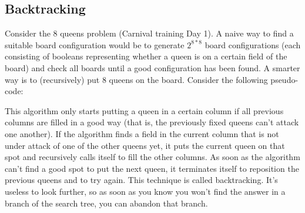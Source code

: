 \subsection{Backtracking}

Consider the 8 queens problem (Carnival training Day 1). A naive way to find a suitable board configuration would be to generate $2^{8*8}$ board configurations (each consisting of booleans representing whether a queen is on a certain field of the board) and check all boards until a good configuration has been found.
A smarter way is to (recursively) put 8 queens on the board. Consider the following pseudo-code:


This algorithm only starts putting a queen in a certain column if all previous columns are filled in a good way (that is, the previously fixed queens can't attack one another). If the algorithm finds a field in the current column that is not under attack of one of the other queens yet, it puts the current queen on that spot and recursively calls itself to fill the other columns. 
As soon as the algorithm can't find a good spot to put the next queen, it terminates itself to reposition the previous queens and to try again.
This technique is called backtracking. It's useless to look further, so as soon as you know you won't find the answer in a branch of the search tree, you can abandon that branch.

